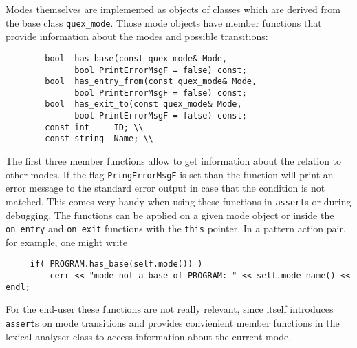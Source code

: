 Modes themselves are implemented as objects of classes which are derived from
the base class {\tt quex\_mode}.  Those mode objects have member functions
that provide information about the modes and possible transitions:

\begin{lstlisting}
        bool  has_base(const quex_mode& Mode,      
              bool PrintErrorMsgF = false) const; 
        bool  has_entry_from(const quex_mode& Mode,
              bool PrintErrorMsgF = false) const;  
        bool  has_exit_to(const quex_mode& Mode, 
              bool PrintErrorMsgF = false) const;
        const int     ID; \\
        const string  Name; \\
\end{lstlisting}

The first three member functions allow to get information about the relation
to other modes. If the flag {\tt PringErrorMsgF} is set than the function will
print an error message to the standard error output in case that the condition
is not matched. This comes very handy when using these functions in {\tt assert}s or
during debugging. The functions can be applied on a given mode object or
inside the {\tt on\_entry} and {\tt on\_exit} functions with the {\tt this}
pointer.  In a pattern action pair, for example, one might write

\begin{lstlisting}
     if( PROGRAM.has_base(self.mode()) )
         cerr << "mode not a base of PROGRAM: " << self.mode_name() << endl;      
\end{lstlisting}

For the end-user these functions are not really relevant, since {\quex}
itself introduces {\tt assert}s on mode transitions and provides convienient member
functions in the lexical analyser class to access information about the
current mode.
